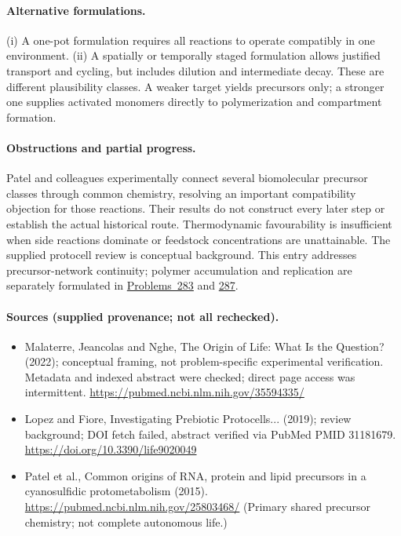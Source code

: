 \documentclass[11pt]{article}
\begin{document}
\paragraph{Alternative formulations.} (i) A one-pot formulation requires all reactions to operate compatibly in one environment. (ii) A spatially or temporally staged formulation allows justified transport and cycling, but includes dilution and intermediate decay. These are different plausibility classes. A weaker target yields precursors only; a stronger one supplies activated monomers directly to polymerization and compartment formation.

\paragraph{Obstructions and partial progress.} Patel and colleagues experimentally connect several biomolecular precursor classes through common chemistry, resolving an important compatibility objection for those reactions. Their results do not construct every later step or establish the actual historical route. Thermodynamic favourability is insufficient when side reactions dominate or feedstock concentrations are unattainable. The supplied protocell review is conceptual background. This entry addresses precursor-network continuity; polymer accumulation and replication are separately formulated in \href{https://we-solve.github.io/problems/prebiotic-polymerisation-in-water-b0d19a08/}{Problems~283} and \href{https://we-solve.github.io/problems/origin-of-self-replicating-ribozymes-d0326d23/}{287}.

\paragraph{Sources (supplied provenance; not all rechecked).} \begin{itemize}
\item Malaterre, Jeancolas and Nghe, The Origin of Life: What Is the Question? (2022); conceptual framing, not problem-specific experimental verification. Metadata and indexed abstract were checked; direct page access was intermittent. \url{https://pubmed.ncbi.nlm.nih.gov/35594335/}
\item Lopez and Fiore, Investigating Prebiotic Protocells... (2019); review background; DOI fetch failed, abstract verified via PubMed PMID 31181679. \url{https://doi.org/10.3390/life9020049}
\item Patel et al., Common origins of RNA, protein and lipid precursors in a cyanosulfidic protometabolism (2015). \url{https://pubmed.ncbi.nlm.nih.gov/25803468/} (Primary shared precursor chemistry; not complete autonomous life.)
\end{itemize}
\end{document}
